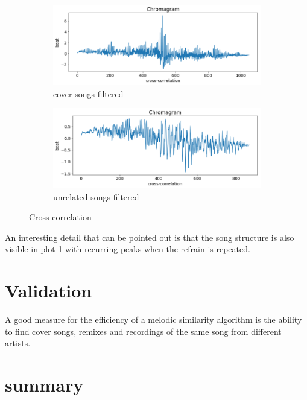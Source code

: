 \begin{figure}[htbp]
{{			\begin{subfigure}{.495\textwidth}
				\centering    
				\includegraphics[scale=0.3]{Images/Chroma/beatalignedchroma_corr_mean_filt.png}
				\caption{cover songs filtered}
				\label{ccf3}
			\end{subfigure}		
			\begin{subfigure}{.495\textwidth}
				\centering     
				\includegraphics[scale=0.3]{Images/Chroma/beatalignedchroma_corr_mean2_filt.png}
				\caption{unrelated songs filtered}
				\label{ccf4}
			\end{subfigure}%
	}}
	\caption{Cross-correlation}
	\label{fig:crosscorr2}
\end{figure}
An interesting detail that can be pointed out is that the song structure is also visible in plot \ref{ccf3} with recurring peaks when the refrain is repeated.

\section{Validation}
A good measure for the efficiency of a melodic similarity algorithm is the ability to find cover songs, remixes and recordings of the same song from different artists. 


\section{summary}

